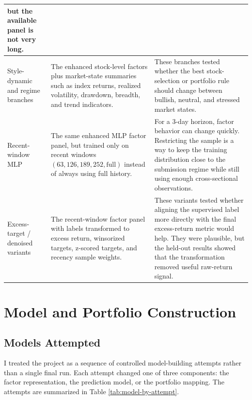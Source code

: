 \documentclass[11pt]{article}
\begin{document}
{\begin{longtable}{p{}p{}p{}}
but the available panel is not very long. \\
\midrule
Style-dynamic and regime branches &
The enhanced stock-level factors plus market-state summaries such as index
returns, realized volatility, drawdown, breadth, and trend indicators. &
These branches tested whether the best stock-selection or portfolio rule should
change between bullish, neutral, and stressed market states. \\
\midrule
Recent-window MLP &
The same enhanced MLP factor panel, but trained only on recent windows
\((63,126,189,252,\text{full})\) instead of always using full history. &
For a 3-day horizon, factor behavior can change quickly. Restricting the sample
is a way to keep the training distribution close to the submission regime while
still using enough cross-sectional observations. \\
\midrule
Excess-target / denoised variants &
The recent-window factor panel with labels transformed to excess return,
winsorized targets, z-scored targets, and recency sample weights. &
These variants tested whether aligning the supervised label more directly with
the final excess-return metric would help. They were plausible, but the held-out
results showed that the transformation removed useful raw-return signal. \\
\bottomrule
\end{longtable}
}

\section{Model and Portfolio Construction}

\subsection{Models Attempted}

I treated the project as a sequence of controlled model-building attempts
rather than a single final run. Each attempt changed one of three components:
the factor representation, the prediction model, or the portfolio mapping. The
attempts are summarized in Table \ref{tab:model-by-attempt}.
\end{document}
